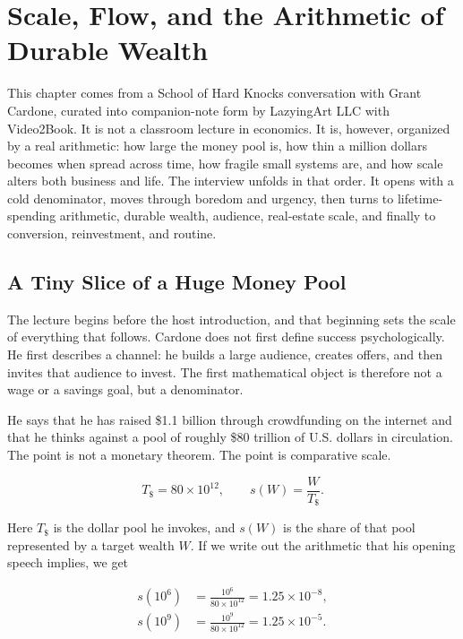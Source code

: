 \chapter{Scale, Flow, and the Arithmetic of Durable Wealth}

This chapter comes from a School of Hard Knocks conversation with Grant Cardone, curated into companion-note form by LazyingArt LLC with Video2Book. It is not a classroom lecture in economics. It is, however, organized by a real arithmetic: how large the money pool is, how thin a million dollars becomes when spread across time, how fragile small systems are, and how scale alters both business and life. The interview unfolds in that order. It opens with a cold denominator, moves through boredom and urgency, then turns to lifetime-spending arithmetic, durable wealth, audience, real-estate scale, and finally to conversion, reinvestment, and routine.

\section{A Tiny Slice of a Huge Money Pool}

The lecture begins before the host introduction, and that beginning sets the scale of everything that follows. Cardone does not first define success psychologically. He first describes a channel: he builds a large audience, creates offers, and then invites that audience to invest. The first mathematical object is therefore not a wage or a savings goal, but a denominator.

He says that he has raised \$1.1 billion through crowdfunding on the internet and that he thinks against a pool of roughly \$80 trillion of U.S. dollars in circulation. The point is not a monetary theorem. The point is comparative scale.

\begin{equation}
T_{\$}=80\times 10^{12},
\qquad
s(W)=\frac{W}{T_{\$}}.
\end{equation}

Here \(T_{\$}\) is the dollar pool he invokes, and \(s(W)\) is the share of that pool represented by a target wealth \(W\). If we write out the arithmetic that his opening speech implies, we get

\begin{align}
s(10^6) &= \frac{10^6}{80\times 10^{12}} = 1.25\times 10^{-8},\\
s(10^9) &= \frac{10^9}{80\times 10^{12}} = 1.25\times 10^{-5}.
\end{align}

